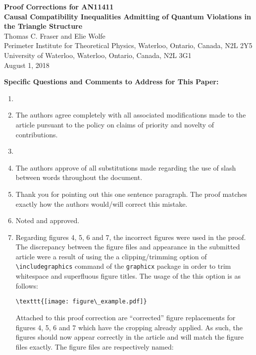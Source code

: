 \documentclass{article}
\begin{document}
    \begin{center}
        \textbf{Proof Corrections for AN11411} \\
        \textbf{Causal Compatibility Inequalities Admitting of Quantum Violations in the Triangle Structure} \\
        Thomas C. Fraser and Elie Wolfe \\
        Perimeter Institute for Theoretical Physics, Waterloo, Ontario, Canada, N2L 2Y5 \\
        University of Waterloo, Waterloo, Ontario, Canada, N2L 3G1\\
        August 1, 2018
    \end{center}

    \textbf{Specific Questions and Comments to Address for This Paper:}
    \begin{enumerate}
        \item
        \item The authors agree completely with all associated modifications made to the article pursuant to the policy on claims of priority and novelty of contributions.
        \item
        \item The authors approve of all substitutions made regarding the use of slash between words throughout the document.
        \item Thank you for pointing out this one sentence paragraph. The proof matches exactly how the authors would/will correct this mistake.
        \item Noted and approved.
        \item Regarding figures 4, 5, 6 and 7, the incorrect figures were used in the proof. The discrepancy between the figure files and appearance in the submitted article were a result of using the a clipping/trimming option of \verb|\includegraphics| command of the \verb|graphicx| package in order to trim whitespace and superfluous figure titles. The usage of the this option is as follows:
        \begin{verbatim}\texttt{[image: figure\_example.pdf]}\end{verbatim}
        Attached to this proof correction are ``corrected'' figure replacements for figures 4, 5, 6 and 7 which have the cropping already applied. As such, the figures should now appear correctly in the article and will match the figure files exactly. The figure files are respectively named:
        \begin{verbatim}

\end{verbatim}
\end{enumerate}
\end{document}
